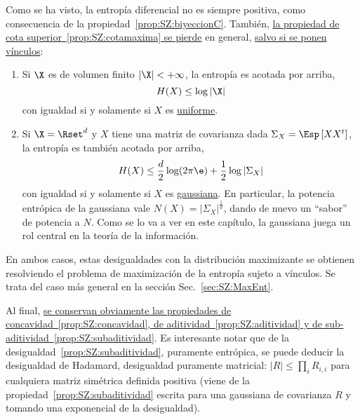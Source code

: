 Como  se  ha visto,  la  entrop\'ia diferencial  no  es  siempre positiva,  como
consecuencia de la propiedad~\ref{prop:SZ:biyeccionC}.  Tambi\'en, \underline{la
  propiedad  de cota  superior~\ref{prop:SZ:cotamaxima} se  pierde}  en general,
\underline{salvo si se ponen v\'inculos}:
%
\begin{propiedadesC}\setcounter{enumi}{\value{PropCotamaxima}}
\item
  \begin{enumerate}
  \item\label{prop:SZ:cotamaximauniforme} Si $\X$ es de volumen finito $|\X| < +
    \infty$, la entrop\'ia es acotada por arriba,
    \[
    H(X) \le \log |\X|
    \]
    con igualdad si y solamente si $X$ es \underline{uniforme}.
  \item\label{prop:SZ:cotamaximagaussiana}  Si  $\X =\Rset^d$  y  $X$ tiene  una
    matriz  de  covarianza  dada  $\Sigma_X  = \Esp\left[  X  X^t  \right]$,  la
    entrop\'ia es tambi\'en acotada por arriba,
    \[
    H(X) \le \frac{d}{2} \log(2 \pi \e) + \frac12 \log |\Sigma_X|
    \]
    con igualdad si y solamente si $X$ es \underline{gaussiana}.  En particular,
    la  potencia  entr\'opica de  la  gaussiana  vale  $N(X) =  \left|  \Sigma_X
    \right|^{\frac1d}$, dando de nuevo un  ``sabor'' de potencia a $N$.  Como se
    lo va  a ver en  este cap\'itulo,  la gaussiana juega  un rol central  en la
    teor\'ia de la informaci\'on.
  \end{enumerate}
  En  ambos casos,  estas  desigualdades con  la  distribuci\'on maximizante  se
  obtienen resolviendo el  problema de maximizaci\'on de la  entrop\'ia sujeto a
  v\'inculos.    Se   trata   del   caso   m\'as   general   en   la   secci\'on
  Sec.~\ref{sec:SZ:MaxEnt}.
\end{propiedadesC}

Al    final,   \underline{se   conservan    obviamente   las    propiedades   de
  concavidad~\ref{prop:SZ:concavidad},  de aditividad~\ref{prop:SZ:aditividad} y
  de sub-aditividad~\ref{prop:SZ:subaditividad}}.   Es interesante notar  que de
la  desigualdad~\ref{prop:SZ:subaditividad},  puramente  entr\'opica,  se  puede
deducir la  desigualdad de Hadamard,  desigualdad puramente matricial:  $|R| \le
\prod_i R_{i,i}$ para cualquiera  matriz sim\'etrica definida positiva (viene de
la   propiedad~\ref{prop:SZ:subaditividad}  escrita   para   una  gaussiana   de
covarianza $R$ y tomando una exponencial de la desigualdad).
